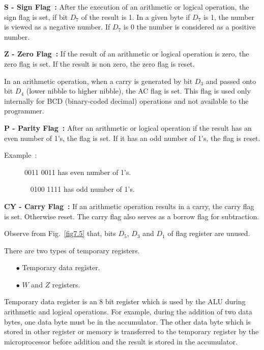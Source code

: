 \noindent
{\bf S - Sign Flag~:} After the execution of an arithmetic or logical operation, the sign flag is set, if bit $D_{7}$ of the result is 1. In a given byte if $D_{7}$ is 1, the number is viewed as a negative number. If $D_{7}$ is $0$ the number is considered as a positive number.

\medskip
\noindent
{\bf Z - Zero Flag~:} If the result of an arithmetic or logical operation is zero, the zero flag is set. If the result is non zero, the zero flag is reset.

\eject

\medskip
{}

In an arithmetic operation, when a carry is generated by bit $D_{3}$ and passed onto bit $D_{4}$ (lower nibble to higher nibble), the AC flag is set. This flag is used only internally for BCD (binary-coded decimal) operations and not available to the programmer.

\medskip
\noindent
{\bf P - Parity Flag~:} After an arithmetic or logical operation if the result has an even number of 1's, the flag is set. If it has an odd number of 1's, the flag is reset.
\begin{description}
\item[Example~:] 0011 0011 has even number of 1's.

\qquad~ 0100 1111 has odd number of 1's.
\end{description}

\noindent
{\bf CY - Carry Flag~:} If an arithmetic operation results in a carry, the carry flag is set. Otherwise reset. The carry flag also serves as a borrow flag for subtraction.

Observe from Fig.~\ref{fig7.5} that, bits $D_{5}$, $D_{3}$ and $D_{1}$ of flag register are unused.

\medskip
{}

There are two types of temporary registers.
\begin{itemize}
\item[$\bullet$] Temporary data register.

\item[$\bullet$] $W$ and $Z$ registers.
\end{itemize}

Temporary data register is an 8 bit register which is used by the ALU during arithmetic and logical operations. For example, during the addition of two data bytes, one data byte must be in the accumulator. The other data byte which is stored in other register or memory is transferred to the temporary register by the microprocessor before addition and the result is stored in the accumulator.

